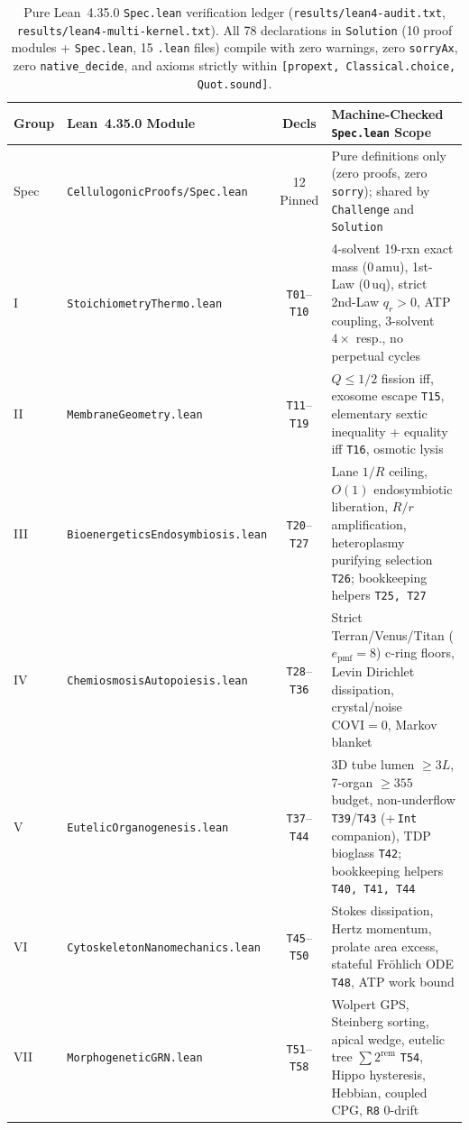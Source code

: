\documentclass[11pt,reqno]{amsart}
\theoremstyle{plain}
\theoremstyle{definition}
\theoremstyle{remark}
\newcommand{\code}[1]{{\footnotesize\nolinkurl{#1}}}
\newcommand{\tcode}[1]{{\scriptsize\nolinkurl{#1}}}
\begin{document}
\begin{table}[ht]
\centering
\caption{Pure Lean~4.35.0 \code{Spec.lean} verification ledger (\code{results/lean4-audit.txt}, \code{results/lean4-multi-kernel.txt}). All 78 declarations in \code{Solution} (10 proof modules + \code{Spec.lean}, 15 \code{.lean} files) compile with zero warnings, zero \code{sorryAx}, zero \code{native\_decide}, and axioms strictly within \code{[propext, Classical.choice, Quot.sound]}.}
\label{tab:lean}
\scriptsize
\setlength{\tabcolsep}{3.5pt}
\begin{tabularx}{\textwidth}{@{} l l c Y @{}}
\toprule
\textbf{Group} & \textbf{Lean~4.35.0 Module} & \textbf{Decls} & \textbf{Machine-Checked \tcode{Spec.lean} Scope} \\
\midrule
Spec & \tcode{CellulogonicProofs/Spec.lean} & 12 Pinned & Pure definitions only (zero proofs, zero \tcode{sorry}); shared by \tcode{Challenge} and \tcode{Solution} \\
I    & \tcode{StoichiometryThermo.lean} & \tcode{T01}--\tcode{T10} & 4-solvent 19-rxn exact mass ($0\,\mathrm{amu}$), 1st-Law ($0\,\mathrm{uq}$), strict 2nd-Law $q_r>0$, ATP coupling, 3-solvent $4\times$ resp., no perpetual cycles \\
II   & \tcode{MembraneGeometry.lean} & \tcode{T11}--\tcode{T19} & $Q \le 1/2$ fission iff, exosome escape \tcode{T15}, elementary sextic inequality + equality iff \tcode{T16}, osmotic lysis \\
III  & \tcode{BioenergeticsEndosymbiosis.lean} & \tcode{T20}--\tcode{T27} & Lane $1/R$ ceiling, $O(1)$ endosymbiotic liberation, $R/r$ amplification, heteroplasmy purifying selection \tcode{T26}; bookkeeping helpers \tcode{T25, T27} \\
IV   & \tcode{ChemiosmosisAutopoiesis.lean} & \tcode{T28}--\tcode{T36} & Strict Terran/Venus/Titan ($e_{\mathrm{pmf}}=8$) c-ring floors, Levin Dirichlet dissipation, crystal/noise $\mathrm{COVI}=0$, Markov blanket \\
V    & \tcode{EutelicOrganogenesis.lean} & \tcode{T37}--\tcode{T44} & 3D tube lumen $\ge 3L$, 7-organ $\ge 355$ budget, non-underflow \tcode{T39}/\tcode{T43} (+\,\tcode{Int} companion), TDP bioglass \tcode{T42}; bookkeeping helpers \tcode{T40, T41, T44} \\
VI   & \tcode{CytoskeletonNanomechanics.lean} & \tcode{T45}--\tcode{T50} & Stokes dissipation, Hertz momentum, prolate area excess, stateful Fr\"ohlich ODE \tcode{T48}, ATP work bound \\
VII  & \tcode{MorphogeneticGRN.lean} & \tcode{T51}--\tcode{T58} & Wolpert GPS, Steinberg sorting, apical wedge, eutelic tree $\sum 2^{\mathrm{rem}}$ \tcode{T54}, Hippo hysteresis, Hebbian, coupled CPG, \tcode{R8} 0-drift \\

\end{tabularx}
\end{table}
\end{document}
